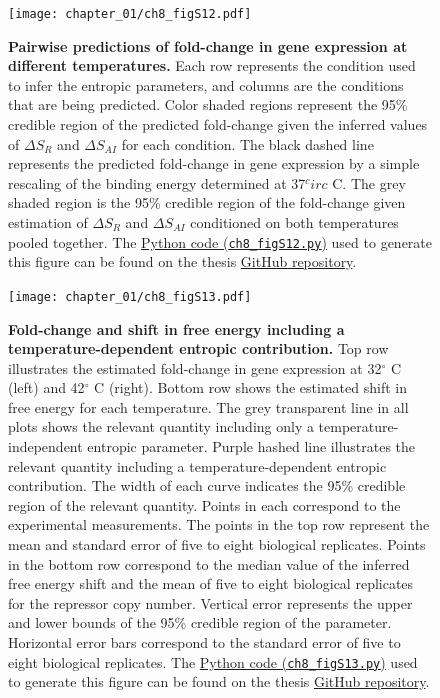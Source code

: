 \documentclass[12pt]{caltech_thesis}
\begin{document}
\hypertarget{fig:entropy_pairwise}{%
\begin{figure}
\centering
\texttt{[image: chapter\_01/ch8\_figS12.pdf]}
\caption[{Pairwise predictions of fold-change in gene expression at
different temperatures.}]{\textbf{Pairwise predictions of fold-change in
gene expression at different temperatures.} Each row represents the
condition used to infer the entropic parameters, and columns are the
conditions that are being predicted. Color shaded regions represent the
95\% credible region of the predicted fold-change given the inferred
values of \(\Delta S_R\) and \(\Delta S_{AI}\) for each condition. The
black dashed line represents the predicted fold-change in gene
expression by a simple rescaling of the binding energy determined at
37\(^circ\) C. The grey shaded region is the 95\% credible region of the
fold-change given estimation of \(\Delta S_R\) and \(\Delta S_{AI}\)
conditioned on both temperatures pooled together. The
\href{https://github.com/gchure/phd/blob/master/src/chapter_08/code/ch8_figS12.py}{Python
code (\texttt{ch8\_figS12.py})} used to generate this figure can be
found on the thesis \href{https://github.com/gchure/phd}{GitHub
repository}.}
\label{fig:entropy_pairwise}
\end{figure}
}

\hypertarget{fig:t_dependent}{%
\begin{figure}
\centering
\texttt{[image: chapter\_01/ch8\_figS13.pdf]}
\caption[{Fold-change and shift in free energy including a
temperature-dependent entropic contribution.}]{\textbf{Fold-change and
shift in free energy including a temperature-dependent entropic
contribution.} Top row illustrates the estimated fold-change in gene
expression at 32\(^\circ\) C (left) and 42\(^\circ\) C (right). Bottom
row shows the estimated shift in free energy for each temperature. The
grey transparent line in all plots shows the relevant quantity including
only a temperature-independent entropic parameter. Purple hashed line
illustrates the relevant quantity including a temperature-dependent
entropic contribution. The width of each curve indicates the 95\%
credible region of the relevant quantity. Points in each correspond to
the experimental measurements. The points in the top row represent the
mean and standard error of five to eight biological replicates. Points
in the bottom row correspond to the median value of the inferred free
energy shift and the mean of five to eight biological replicates for the
repressor copy number. Vertical error represents the upper and lower
bounds of the 95\% credible region of the parameter. Horizontal error
bars correspond to the standard error of five to eight biological
replicates. The
\href{https://github.com/gchure/phd/blob/master/src/chapter_08/code/ch8_figS13.py}{Python
code (\texttt{ch8\_figS13.py})} used to generate this figure can be
found on the thesis \href{https://github.com/gchure/phd}{GitHub
repository}.}
\label{fig:t_dependent}
\end{figure}
}
\end{document}
